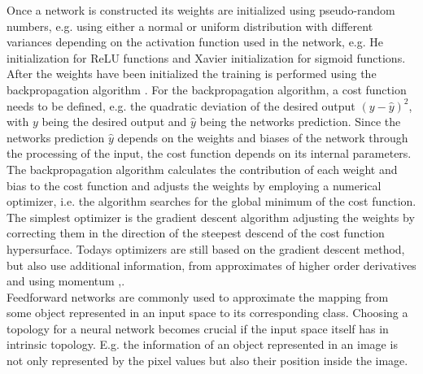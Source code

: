 Once a network is constructed its weights are initialized using pseudo-random numbers, e.g. using either a normal or uniform distribution with different variances depending on the activation function used in the network, e.g. He initialization \cite{He2015} for ReLU functions and Xavier initialization \cite{Glorot2010} for sigmoid functions. After the weights have been initialized the training is performed using the backpropagation algorithm \cite{Rumelhart1986}. For the backpropagation algorithm, a cost function needs to be defined, e.g. the quadratic deviation of the desired output $(y-\hat{y})^2$, with $y$ being the desired output and $\hat{y}$ being the networks prediction. Since the networks prediction $\hat{y}$ depends on the weights and biases of the network through the processing of the input, the cost function depends on its internal parameters. The backpropagation algorithm calculates the contribution of each weight and bias to the cost function and adjusts the weights by employing a numerical optimizer, i.e. the algorithm searches for the global minimum of the cost function.  The simplest optimizer is the gradient descent algorithm adjusting the weights by correcting them in the direction of the steepest descend of the cost function hypersurface. Todays optimizers are still based on the gradient descent method, but also use additional information, from approximates of higher order derivatives and using momentum \cite{Duchi2010},\cite{Sharma2017}. \\

Feedforward networks are commonly used to approximate the mapping from some object represented in an input space to its corresponding class. %
 Choosing a topology for a neural network becomes crucial if the input space itself has in intrinsic topology. E.g. the information of an object represented in an image is not only represented by the pixel values but also their position inside the image.\\

